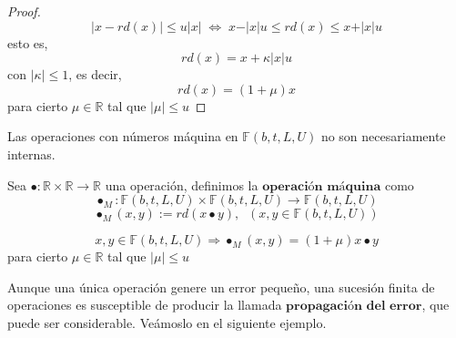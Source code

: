 \begin{proof}
\[ \vert x - rd(x) \vert \leq u \vert x \vert \; \Leftrightarrow \; x - \vert x \vert u \leq rd(x) \leq x + \vert x \vert u \]
esto es,
\[ rd(x) = x +\kappa \vert x \vert u \]
con $\vert \kappa \vert \leq 1$, es decir,
\[ rd(x) = (1 + \mu )x \]
para cierto $\mu \in \mathbb{R}$ tal que $\vert \mu \vert \leq u$
\end{proof}

Las operaciones con números máquina en $\mathbb{F} (b,t,L,U)$ no son necesariamente internas.

\begin{ndef}
Sea $\bullet : \mathbb{R} \times \mathbb{R} \rightarrow \mathbb{R}$ una operación, definimos la $\textbf{operación máquina}$ como
\[ \bullet _M : \mathbb{F} (b,t,L,U) \times \mathbb{F} (b,t,L,U) \rightarrow \mathbb{F} (b,t,L,U) \]
\[ \bullet _M (x,y) := rd(x \bullet y), \; \; (x,y \in \mathbb{F} (b,t,L,U)) \]
\end{ndef}

\begin{ncor}
\[ x,y \in \mathbb{F} (b,t,L,U) \Rightarrow \bullet _M (x,y) = (1 + \mu ) x \bullet y \]
para cierto $\mu \in \mathbb{R}$ tal que $\vert \mu \vert \leq u$
\end{ncor}

Aunque una única operación genere un error pequeño, una sucesión finita de operaciones es susceptible de producir la llamada $\textbf{propagación del error}$, que puede ser considerable. Veámoslo en el siguiente ejemplo.

